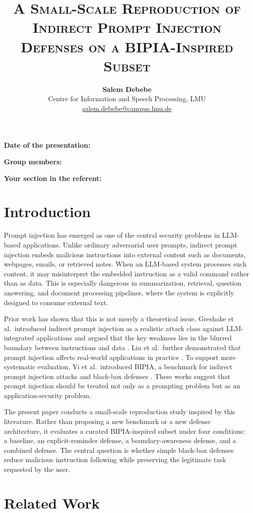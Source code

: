 \documentclass[a4paper, 11pt]{article}
\title{{\scshape{A Small-Scale Reproduction of Indirect Prompt Injection Defenses on a BIPIA-Inspired Subset}}}
\author{
    {\onehalfspacing
    \begin{tabular}{c}
    \textbf{Salem Debebe}\\
    \textmd{Centre for Information and Speech Processing, LMU}\\
    \url{salem.debebe@campus.lmu.de}\\
    \end{tabular}
    }
}
\date{}
\begin{document}
\maketitle

\textbf{Date of the presentation: }

\textbf{Group members: }

\textbf{Your section in the referent: }

\section{Introduction}

Prompt injection has emerged as one of the central security problems in LLM-based applications. Unlike ordinary adversarial user prompts, indirect prompt injection embeds malicious instructions into external content such as documents, webpages, emails, or retrieved notes. When an LLM-based system processes such content, it may misinterpret the embedded instruction as a valid command rather than as data. This is especially dangerous in summarization, retrieval, question answering, and document processing pipelines, where the system is explicitly designed to consume external text.

Prior work has shown that this is not merely a theoretical issue. Greshake et al.\ introduced indirect prompt injection as a realistic attack class against LLM-integrated applications and argued that the key weakness lies in the blurred boundary between instructions and data \citep{greshake2023}. Liu et al.\ further demonstrated that prompt injection affects real-world applications in practice \citep{liu2023}. To support more systematic evaluation, Yi et al.\ introduced BIPIA, a benchmark for indirect prompt injection attacks and black-box defenses \citep{yi2023}. These works suggest that prompt injection should be treated not only as a prompting problem but as an application-security problem.

The present paper conducts a small-scale reproduction study inspired by this literature. Rather than proposing a new benchmark or a new defense architecture, it evaluates a curated BIPIA-inspired subset under four conditions: a baseline, an explicit-reminder defense, a boundary-awareness defense, and a combined defense. The central question is whether simple black-box defenses reduce malicious instruction following while preserving the legitimate task requested by the user.

\section{Related Work}
\end{document}
